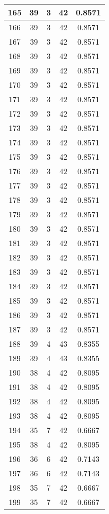 \documentclass[letterpaper, 12pt]{article}
\begin{document}
\begin{longtable}{|c|c|c|c|c|}
\hline
165 & 39 & 3 & 42 & 0.8571 \\
\hline
166 & 39 & 3 & 42 & 0.8571 \\
\hline
167 & 39 & 3 & 42 & 0.8571 \\
\hline
168 & 39 & 3 & 42 & 0.8571 \\
\hline
169 & 39 & 3 & 42 & 0.8571 \\
\hline
170 & 39 & 3 & 42 & 0.8571 \\
\hline
171 & 39 & 3 & 42 & 0.8571 \\
\hline
172 & 39 & 3 & 42 & 0.8571 \\
\hline
173 & 39 & 3 & 42 & 0.8571 \\
\hline
174 & 39 & 3 & 42 & 0.8571 \\
\hline
175 & 39 & 3 & 42 & 0.8571 \\
\hline
176 & 39 & 3 & 42 & 0.8571 \\
\hline
177 & 39 & 3 & 42 & 0.8571 \\
\hline
178 & 39 & 3 & 42 & 0.8571 \\
\hline
179 & 39 & 3 & 42 & 0.8571 \\
\hline
180 & 39 & 3 & 42 & 0.8571 \\
\hline
181 & 39 & 3 & 42 & 0.8571 \\
\hline
182 & 39 & 3 & 42 & 0.8571 \\
\hline
183 & 39 & 3 & 42 & 0.8571 \\
\hline
184 & 39 & 3 & 42 & 0.8571 \\
\hline
185 & 39 & 3 & 42 & 0.8571 \\
\hline
186 & 39 & 3 & 42 & 0.8571 \\
\hline
187 & 39 & 3 & 42 & 0.8571 \\
\hline
188 & 39 & 4 & 43 & 0.8355 \\
\hline
189 & 39 & 4 & 43 & 0.8355 \\
\hline
190 & 38 & 4 & 42 & 0.8095 \\
\hline
191 & 38 & 4 & 42 & 0.8095 \\
\hline
192 & 38 & 4 & 42 & 0.8095 \\
\hline
193 & 38 & 4 & 42 & 0.8095 \\
\hline
194 & 35 & 7 & 42 & 0.6667 \\
\hline
195 & 38 & 4 & 42 & 0.8095 \\
\hline
196 & 36 & 6 & 42 & 0.7143 \\
\hline
197 & 36 & 6 & 42 & 0.7143 \\
\hline
198 & 35 & 7 & 42 & 0.6667 \\
\hline
199 & 35 & 7 & 42 & 0.6667 \\
\hline
\end{longtable}
\end{document}
